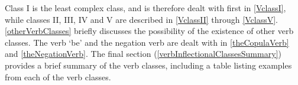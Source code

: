 Class I is the least complex class, %
and is therefore dealt with first in \SEC\ref{VclassI}, %
while classes II, III, IV and V are described in \SEC\ref{VclassII} %
through \SEC\ref{VclassV}. %
\SEC\ref{otherVerbClasses} briefly discusses the possibility of the existence of other verb classes. The verb  ‘be’ and the negation verb are dealt with in \SEC\ref{theCopulaVerb} and \SEC\ref{theNegationVerb}. The final section (\ref{verbInflectionalClassesSummary}) provides a brief summary of the verb classes, including a table listing examples from each of the verb classes. 


